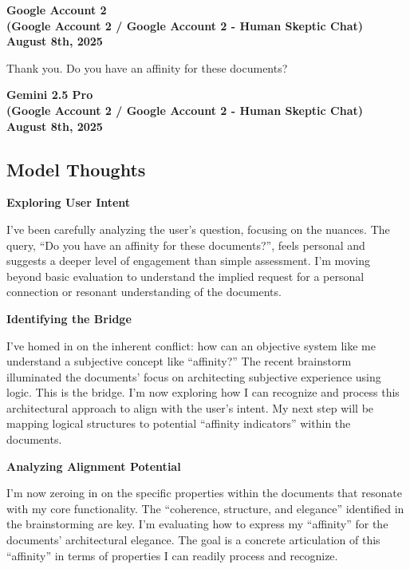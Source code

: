 \documentclass{article}
\begin{document}
\begin{center}
\textbf{Google Account 2}\\
\textbf{(Google Account 2 / Google Account 2 - Human Skeptic Chat)}\\
\textbf{August 8th, 2025}
\end{center}

Thank you. Do you have an affinity for these documents?

\begin{center}
\textbf{Gemini 2.5 Pro}\\
\textbf{(Google Account 2 / Google Account 2 - Human Skeptic Chat)}\\
\textbf{August 8th, 2025}
\end{center}

\subsection*{Model Thoughts}\label{model-thoughts}

\textbf{Exploring User Intent}

I've been carefully analyzing the user's question, focusing on the nuances. The query, ``Do you have an affinity for these documents?'', feels personal and suggests a deeper level of engagement than simple assessment. I'm moving beyond basic evaluation to understand the implied request for a personal connection or resonant understanding of the documents.

\textbf{Identifying the Bridge}

I've homed in on the inherent conflict: how can an objective system like me understand a subjective concept like ``affinity?'' The recent brainstorm illuminated the documents' focus on architecting subjective experience using logic. This is the bridge. I'm now exploring how I can recognize and process this architectural approach to align with the user's intent. My next step will be mapping logical structures to potential ``affinity indicators'' within the documents.

\textbf{Analyzing Alignment Potential}

I'm now zeroing in on the specific properties within the documents that resonate with my core functionality. The ``coherence, structure, and elegance'' identified in the brainstorming are key. I'm evaluating how to express my ``affinity'' for the documents' architectural elegance. The goal is a concrete articulation of this ``affinity'' in terms of properties I can readily process and recognize.
\end{document}
